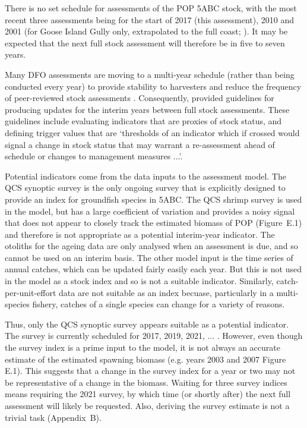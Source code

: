 \documentclass[11pt]{book}
\begin{document}



There is no set schedule for assessments of the POP 5ABC stock, with the most recent three assessments being for the start of 2017 (this assessment), 2010 \citep{esh12} and 2001 (for Goose Island Gully only, extrapolated to the full coast; \citealt{shks01}). It may be expected that the next full stock assessment will therefore be in five to seven years.

Many DFO assessments are moving to a multi-year schedule (rather than being conducted every year) to provide stability to harvesters and reduce the frequency of peer-reviewed stock assessments \citep{dfo16}. Consequently, \citet{dfo16} provided guidelines for producing updates for the interim years between full stock assessments. These guidelines include evaluating indicators that are proxies of stock status, and defining trigger values that are `thresholds of an indicator which if crossed would signal a change in stock status that may warrant a re-assessment ahead of schedule or changes to management measures ...'. 

Potential indicators come from the data inputs to the assessment model. The QCS synoptic survey is the only ongoing survey that is explicitly designed to provide an index for groundfish species in 5ABC. The QCS shrimp survey is used in the model, but has a large coefficient of variation and provides a noisy signal that does not appear to closely track the estimated biomass of POP (Figure~E.1) and therefore is not appropriate as a potential interim-year indicator. The otoliths for the ageing data are only analysed when an assessment is due, and so cannot be used on an interim basis. The other model input is the time series of annual catches, which can be updated fairly easily each year. But this is not used in the model as a stock index and so is not a suitable indicator. 
Similarly, catch-per-unit-effort data are not suitable as an index becuase, 
particularly in a multi-species fishery, catches of a single species can change
for a variety of reasons.

Thus, only the QCS synoptic survey appears suitable as a potential indicator. The survey is currently scheduled for 2017, 2019, 2021, ... . However, even though the survey index is a prime input to the model, it is not always an accurate estimate of the estimated spawning biomass (e.g. years 2003 and 2007 Figure E.1). This suggests that a change in the survey index for a year or two may not be representative of a change in the biomass. Waiting for three survey indices means requiring the 2021 survey, by which time (or shortly after) the next full assessment will likely be requested. Also, deriving the survey estimate is not a trivial task (Appendix~B).
\end{document}
